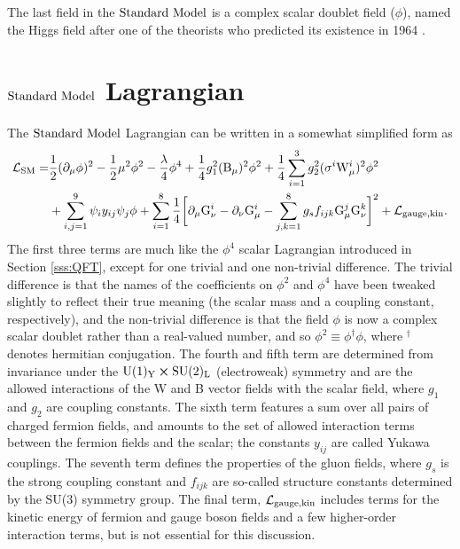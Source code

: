 The last field in the $\text{Standard\ Model}$ is a complex scalar doublet field ($\phi$), named the Higgs field after one of the theorists who predicted its existence in 1964 \cite{Higgs:1964pj}. 

\section{$\text{Standard\ Model}$ Lagrangian}
The $\text{Standard\ Model}$ Lagrangian \cite{Langacker:1995hi} can be written in a somewhat simplified form as
\begin{align}
\begin{split}
\mathcal{L}_{\rm SM} =& \frac{1}{2}(\partial_\mu \phi)^2 
- \frac{1}{2}\mu^2\phi^{2}
-\frac{\lambda}{4}\phi^{4}
+\frac{1}{4}g_{1}^{2}({\rm B}_{\mu})^2\phi^2 + \frac{1}{4}\sum_{i=1}^{3}g_{2}^2 (\sigma^{i} {\rm W}^{i}_{\mu})^2\phi^2 \\
&+ \sum_{i,j=1}^{9}\psi_i y_{ij} \psi_{j}\phi
+\sum_{i=1}^{8}\frac{1}{4}\bigg[\partial_\mu {\rm G}^{i}_\nu - \partial_\nu {\rm G}^{i}_\mu - \sum_{j,k=1}^{8}g_s f_{ijk} {\rm G}^{j}_{\mu}{\rm G}^{k}_{\nu}\bigg]^2
+\mathcal{L}_{\rm gauge, kin}.
\end{split}
\end{align}
The first three terms are much like the $\phi^4$ scalar Lagrangian introduced in Section \ref{sss:QFT}, except for one trivial and one non-trivial difference. The trivial difference is that the names of the coefficients on $\phi^2$ and $\phi^4$ have been tweaked slightly to reflect their true meaning (the scalar mass and a coupling constant, respectively), and the non-trivial difference is that the field $\phi$ is now a complex scalar doublet rather than a real-valued number, and so $\phi^2\equiv\phi^{\dag}\phi$, where $^\dag$ denotes hermitian conjugation. The fourth and fifth term are determined from invariance under the $\rm U(1)_{Y}\cross\rm SU(2)_{L}$ (electroweak) symmetry and are the allowed interactions of the W and B vector fields with the scalar field, where $g_{1}$ and $g_{2}$ are coupling constants. The sixth term features a sum over all pairs of charged fermion fields, and amounts to the set of allowed interaction terms between the fermion fields and the scalar; the constants $y_{ij}$ are called Yukawa couplings. The seventh term defines the properties of the gluon fields, where $g_s$ is the strong coupling constant and $f_{ijk}$ are so-called structure constants determined by the SU(3) symmetry group. The final term, $\mathcal{L}_{\rm gauge, kin}$ includes terms for the kinetic energy of fermion and gauge boson fields and a few higher-order interaction terms, but is not essential for this discussion.

